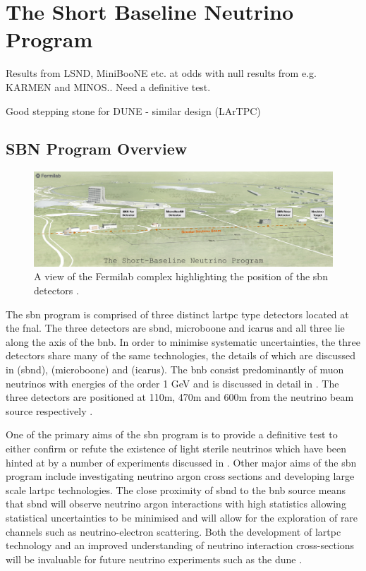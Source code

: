 \chapter{The Short Baseline Neutrino Program}
\label{chap:SBN Program}
Results from LSND, MiniBooNE etc. at odds with null results from e.g. KARMEN and MINOS.. Need a definitive test.

Good stepping stone for DUNE - similar design (LArTPC)


\section{SBN Program Overview}

\begin{figure}
    \centering
    \includegraphics[width = \largefigwidth]{figures-chap3/SBN_program.jpg}
    \caption[SBN map.]{A view of the Fermilab complex highlighting the position of the \gls{sbn} detectors \cite{SBN_paper}.}
    \label{fig:my_label}
\end{figure}

The \gls{sbn} program is comprised of three distinct \gls{lartpc} type detectors located at the \gls{fnal}. The three detectors are \gls{sbnd}, \gls{microboone} and \gls{icarus} and all three lie along the axis of the \gls{bnb}. In order to minimise systematic uncertainties, the three detectors share many of the same technologies, the details of which are discussed in  (\gls{sbnd}),  (\gls{microboone}) and  (\gls{icarus}). The \gls{bnb} consist predominantly of muon neutrinos with energies of the order 1 GeV and is discussed in detail in . The three detectors are positioned at 110m, 470m and 600m from the neutrino beam source respectively \cite{SBN_paper}. 

One of the primary aims of the \gls{sbn} program is to provide a definitive test to either confirm or refute the existence of light sterile neutrinos which have been hinted at by a number of experiments discussed in . Other major aims of the \gls{sbn} program include investigating neutrino argon cross sections and developing large scale \gls{lartpc} technologies. The close proximity of \gls{sbnd} to the \gls{bnb} source means that \gls{sbnd} will observe neutrino argon interactions with high statistics allowing statistical uncertainties to be minimised and will allow for the exploration of rare channels such as neutrino-electron scattering. Both the development of \gls{lartpc} technology and an improved understanding of neutrino interaction cross-sections will be invaluable for future neutrino experiments such as the \gls{dune} \cite{SBN_paper}.


